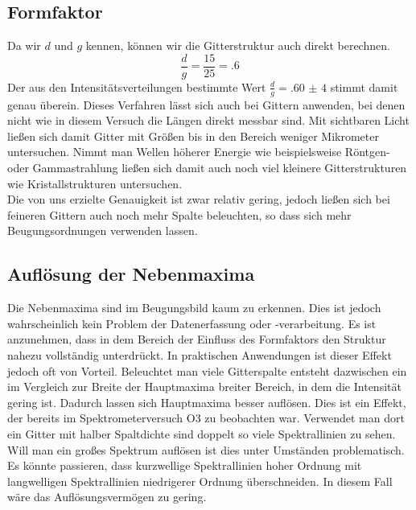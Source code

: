 \subsection{Formfaktor}
Da wir $ d $ und $ g $ kennen, können wir die Gitterstruktur auch direkt berechnen. 
\begin{equation*}
	\frac{d}{g} = \frac{15}{25} = \num{.6}
\end{equation*}
Der aus den Intensitätsverteilungen bestimmte Wert $ \frac{d}{g} = \num{,60(4)} $ stimmt damit genau überein. Dieses Verfahren lässt sich auch bei Gittern anwenden, bei denen nicht wie in diesem Versuch die Längen direkt messbar sind. Mit sichtbaren Licht ließen sich damit Gitter mit Größen bis in den Bereich weniger Mikrometer untersuchen. Nimmt man
Wellen höherer Energie wie beispielsweise Röntgen- oder Gammastrahlung ließen sich damit auch noch viel kleinere Gitterstrukturen wie Kristallstrukturen untersuchen. \\
Die von uns erzielte Genauigkeit ist zwar relativ gering, jedoch ließen sich bei feineren Gittern auch noch mehr Spalte beleuchten, so dass sich mehr Beugungsordnungen verwenden lassen.

\subsection{Auflösung der Nebenmaxima}
Die Nebenmaxima sind im Beugungsbild kaum zu erkennen. Dies ist jedoch wahrscheinlich kein Problem der Datenerfassung oder -verarbeitung. Es ist anzunehmen, dass in dem Bereich der Einfluss des Formfaktors den Struktur nahezu vollständig unterdrückt. In praktischen Anwendungen ist dieser Effekt jedoch oft von Vorteil. Beleuchtet man viele Gitterspalte entsteht dazwischen ein im Vergleich zur Breite der Hauptmaxima breiter Bereich, in dem die Intensität gering ist. Dadurch lassen sich Hauptmaxima besser auflösen. Dies ist ein Effekt, der bereits im Spektrometerversuch O3 zu beobachten war. Verwendet man dort ein Gitter mit halber Spaltdichte sind doppelt so viele Spektrallinien zu sehen. Will man ein großes Spektrum auflösen ist dies unter Umständen problematisch. Es könnte passieren, dass kurzwellige Spektrallinien hoher Ordnung mit langwelligen Spektrallinien niedrigerer Ordnung überschneiden. In diesem Fall wäre das Auflösungsvermögen zu gering.
